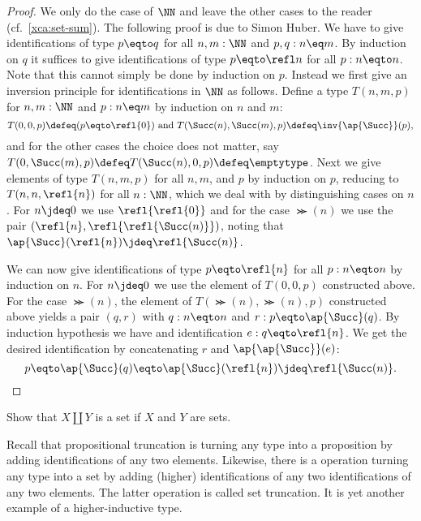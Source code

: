 \begin{proof}
  We only do the case of $\NN$ and leave the other cases to the reader
  (cf.\ \cref{xca:set-sum}). The following proof is due to Simon Huber.
  We have to give identifications of type $p \eqto q$ for all $n,m : \NN$
  and $p, q : n \eq m$.
  By induction on $q$ it suffices to give identifications of type
  $p \eqto \refl n$ for all $p : n \eqto n$.
  Note that this cannot simply be done by induction on $p$.
  Instead we first give an inversion principle for
  identifications in $\NN$ as follows. Define a type $T(n,m,p)$
  for $n, m : \NN$ and $p : n \eq m$ by induction on $n$ and $m$:
  \[
    T(0,0,p) \defeq (p \eqto \refl{0})%
    \text{~and~}%
    T(\Succ(n), \Succ(m), p) \defeq \inv{\ap{\Succ}}(p),%
  \]
  and for the other cases the choice does not matter,
  say $T(0, \Succ(m), p) \defeq T(\Succ(n), 0 ,p) \defeq \emptytype$.
  Next we give elements of type $T(n,m,p)$
  for all $n,m$, and $p$ by induction on $p$, reducing to
  $T(n,n,\refl{n})$ for all $n : \NN$, which we deal with by
  distinguishing cases on $n$.
  For $n\jdeq 0$ we use $\refl{\refl{0}}$ and for the case $\Succ(n)$
  we use the pair $(\refl{n},\refl{\refl{\Succ(n)}})$,
  noting that $\ap{\Succ}(\refl{n}) \jdeq \refl{\Succ(n)}$.

  We can now give identifications of type $p \eqto \refl{n}$ for all
  $p : n \eqto n$ by induction on $n$.
  For $n\jdeq 0$ we use the element of  $T(0,0,p)$ constructed above.
  For the case $\Succ(n)$, the element of $T(\Succ(n),\Succ(n),p)$
  constructed above yields a pair $(q,r)$ with $q : n \eqto n$ and
  $r: p \eqto \ap{\Succ}(q)$. By induction hypothesis we have
  and identification $e : q \eqto \refl{n}$. We get the desired
  identification by concatenating $r$ and $\ap{\ap{\Succ}}(e)$:
  \[
    p \eqto \ap{\Succ}(q) \eqto \ap{\Succ}(\refl{n}) \jdeq \refl{\Succ(n)}.
    \qedhere
  \]
\end{proof}

\begin{xca}\label{xca:set-sum}
Show that $X\amalg Y$ is a set if $X$ and $Y$ are sets.
\end{xca}

Recall that propositional truncation is turning any type into
a proposition by adding identifications of any two elements.
Likewise, there is a operation turning any type into a set
by adding (higher) identifications of any two identifications
of any two elements. The latter operation is called set truncation.
It is yet another example of a higher-inductive type.

